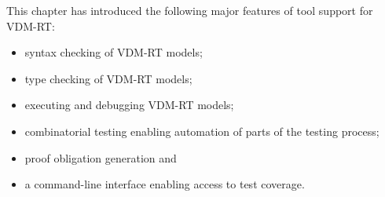 This chapter has introduced the following major features of tool
support for VDM-RT:
\begin{itemize}
\item syntax checking of VDM-RT models;
\item type checking of VDM-RT models;
\item executing and debugging VDM-RT models;
\item combinatorial testing enabling automation of parts of the
  testing process; 
\item proof obligation generation and
\item a command-line interface enabling access to test coverage.
\end{itemize}
